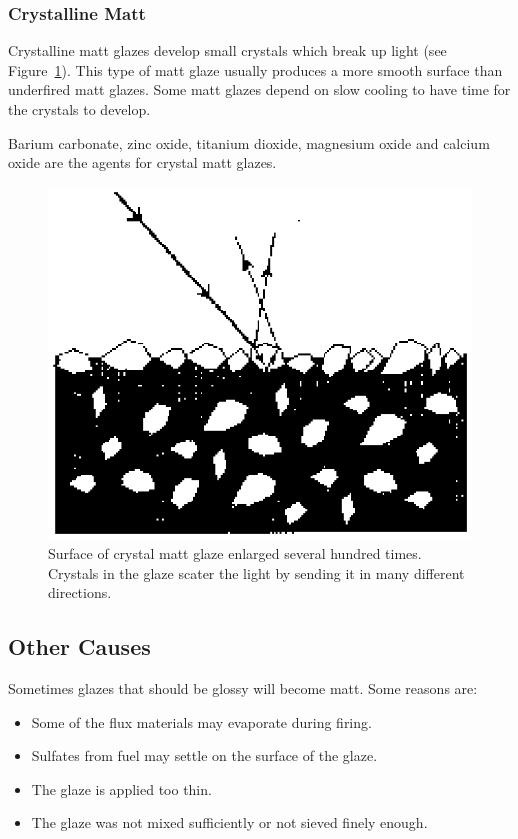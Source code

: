 \subsubsection{Crystalline Matt}
Crystalline matt glazes develop small crystals which break up light (see 
Figure~\ref{fig:crystallinematt}). This type of matt glaze usually produces a 
more smooth surface than underfired matt glazes. Some matt glazes depend on 
slow cooling to have time for the crystals to develop.

Barium carbonate, zinc oxide, titanium dioxide, magnesium oxide and calcium 
oxide are the agents for crystal matt glazes.
\begin{figure}[htbp!]
  \centering
  \includegraphics[width=0.5\linewidth]{img/crystallinematt.eps}
  \caption{Surface of crystal matt glaze enlarged several hundred times. 
    Crystals in the glaze scater the light by sending it in many different 
    directions.}
  \label{fig:crystallinematt}
\end{figure}
\subsection{Other Causes}
Sometimes glazes that should be glossy will become matt. Some reasons 
are:
\begin{itemize}
\item Some of the flux materials may evaporate during firing.
\item Sulfates from fuel may settle on the surface of the glaze.
\item The glaze is applied too thin.
\item The glaze was not mixed sufficiently or not sieved finely enough.
\end{itemize}

